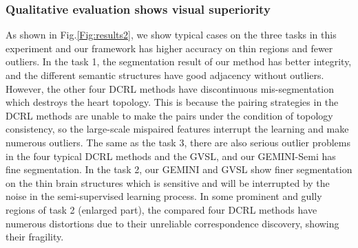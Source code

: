 \subsubsection{Qualitative evaluation shows visual superiority}
As shown in Fig.\ref{Fig:results2}, we show typical cases on the three tasks in this experiment and our framework has higher accuracy on thin regions and fewer outliers. In the task 1, the segmentation result of our method has better integrity, and the different semantic structures have good adjacency without outliers. However, the other four DCRL methods have discontinuous mis-segmentation which destroys the heart topology. This is because the pairing strategies in the DCRL methods are unable to make the pairs under the condition of topology consistency, so the large-scale mispaired features interrupt the learning and make numerous outliers. The same as the task 3, there are also serious outlier problems in the four typical DCRL methods and the GVSL, and our GEMINI-Semi has fine segmentation. In the task 2, our GEMINI and GVSL show finer segmentation on the thin brain structures which is sensitive and will be interrupted by the noise in the semi-supervised learning process. In some prominent and gully regions of task 2 (enlarged part), the compared four DCRL methods have numerous distortions due to their unreliable correspondence discovery, showing their fragility.


